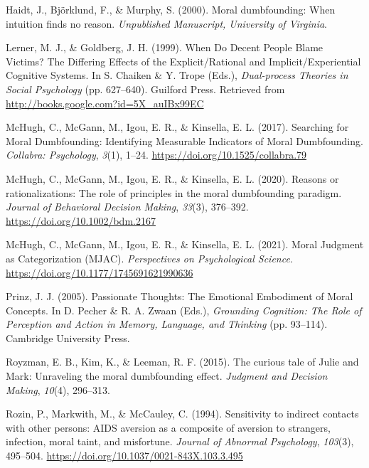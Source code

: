 \documentclass[
  american,
  man,floatsintext]{apa7}
\begin{document}
\leavevmode\hypertarget{ref-haidt_moral_2000}{}%
Haidt, J., Björklund, F., \& Murphy, S. (2000). Moral dumbfounding: When intuition finds no reason. \emph{Unpublished Manuscript, University of Virginia}.

\leavevmode\hypertarget{ref-lerner_when_1999}{}%
Lerner, M. J., \& Goldberg, J. H. (1999). When Do Decent People Blame Victims? The Differing Effects of the Explicit/Rational and Implicit/Experiential Cognitive Systems. In S. Chaiken \& Y. Trope (Eds.), \emph{Dual-process Theories in Social Psychology} (pp. 627--640). Guilford Press. Retrieved from \url{http://books.google.com?id=5X_auIBx99EC}

\leavevmode\hypertarget{ref-mchugh_searching_2017a}{}%
McHugh, C., McGann, M., Igou, E. R., \& Kinsella, E. L. (2017). Searching for Moral Dumbfounding: Identifying Measurable Indicators of Moral Dumbfounding. \emph{Collabra: Psychology}, \emph{3}(1), 1--24. \url{https://doi.org/10.1525/collabra.79}

\leavevmode\hypertarget{ref-mchugh_reasons_2020}{}%
McHugh, C., McGann, M., Igou, E. R., \& Kinsella, E. L. (2020). Reasons or rationalizations: The role of principles in the moral dumbfounding paradigm. \emph{Journal of Behavioral Decision Making}, \emph{33}(3), 376--392. \url{https://doi.org/10.1002/bdm.2167}

\leavevmode\hypertarget{ref-mchugh_moral_2021}{}%
McHugh, C., McGann, M., Igou, E. R., \& Kinsella, E. L. (2021). Moral Judgment as Categorization (MJAC). \emph{Perspectives on Psychological Science}. \url{https://doi.org/10.1177/1745691621990636}

\leavevmode\hypertarget{ref-prinz_passionate_2005}{}%
Prinz, J. J. (2005). Passionate Thoughts: The Emotional Embodiment of Moral Concepts. In D. Pecher \& R. A. Zwaan (Eds.), \emph{Grounding Cognition: The Role of Perception and Action in Memory, Language, and Thinking} (pp. 93--114). Cambridge University Press.

\leavevmode\hypertarget{ref-royzman_curious_2015}{}%
Royzman, E. B., Kim, K., \& Leeman, R. F. (2015). The curious tale of Julie and Mark: Unraveling the moral dumbfounding effect. \emph{Judgment and Decision Making}, \emph{10}(4), 296--313.

\leavevmode\hypertarget{ref-rozin_sensitivity_1994}{}%
Rozin, P., Markwith, M., \& McCauley, C. (1994). Sensitivity to indirect contacts with other persons: AIDS aversion as a composite of aversion to strangers, infection, moral taint, and misfortune. \emph{Journal of Abnormal Psychology}, \emph{103}(3), 495--504. \url{https://doi.org/10.1037/0021-843X.103.3.495}
\end{document}
